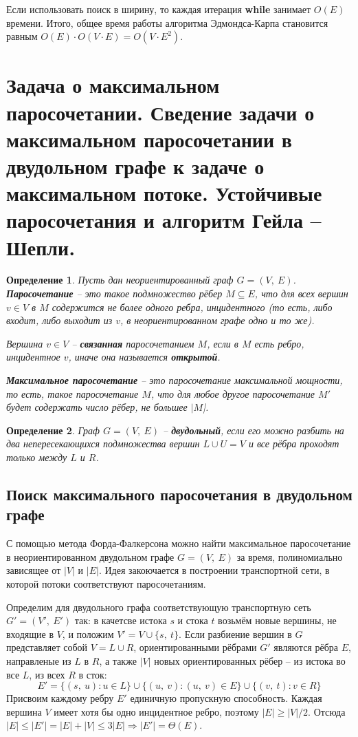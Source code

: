 \documentclass[a4paper,12pt]{article}
\newtheorem*{definition}{Определение}
\begin{document}
Если использовать поиск в ширину, то каждая итерация \textbf{while} занимает $O(E)$ времени. Итого, общее время работы алгоритма Эдмондса-Карпа становится равным $O(E) \cdot O(V \cdot E) = O(V \cdot E^2)$.
\newpage
\section{Задача о максимальном паросочетании. Сведение задачи о максимальном паросочетании в двудольном графе к задаче о максимальном потоке. Устойчивые паросочетания и алгоритм Гейла – Шепли.}

\begin{definition}
    Пусть дан неориентированный граф $G = (V,\ E)$. \textbf{Паросочетание} -- это такое подмножество рёбер $M \subseteq E$, что для всех вершин $v \in V$ в $M$ содержится не более одного ребра, инцидентного (то есть, либо входит, либо выходит из $v$, в неориентированном графе одно и то же). 
    
    Вершина $v \in V$ -- \textbf{связанная} паросочетанием $M$, если в $M$ есть ребро, инцидентное $v$, иначе она называется  \textbf{открытой}.
    
    \textbf{Максимальное паросочетание} -- это паросочетание максимальной мощности, то есть, такое паросочетание $M$, что для любое другое паросочетание $M'$ будет содержать число рёбер, не большее $|M$|.
\end{definition}

\begin{definition}
    Граф $G = (V,\ E)$ -- \textbf{двудольный}, если его можно разбить на два непересекающихся подмножества вершин $L \cup U = V$ и все рёбра проходят только между $L$ и $R$.
\end{definition}

\subsection{Поиск максимального паросочетания в двудольном графе}

С помощью метода Форда-Фалкерсона можно найти максимальное паросочетание в неориентированном двудольном графе $G = (V,\ E)$ за время, полиномиально зависящее от $|V|$ и $|E|$. Идея закоючается в построении транспортной сети, в которой потоки соответствуют паросочетаниям. 

Определим для двудольного графа соответствующую транспортную сеть $G' = (V',\ E')$ так: в качетсве истока $s$ и стока $t$ возьмём новые вершины, не входящие в  $V$, и положим $V' = V \cup \{s,\ t\}$. Если разбиение вершин в $G$ представляет собой $V = L \cup R$, ориентированными рёбрами $G'$ являются рёбра $E$, направленые из $L$ в $R$, а также $|V|$ новых ориентированных рёбер -- из истока во все $L$, из всех $R$ в сток:\[E' = \{(s,\ u) : u \in L\} \cup \{(u,\ v) : (u,\ v) \in E\} \cup \{(v,\ t) : v \in R\}\]
Присвоим каждому ребру $E'$ единичную пропускную способность. Каждая вершина $V$ имеет хотя бы одно инцидентное ребро, поэтому $|E| \geqslant |V|\slash 2$. Отсюда $|E| \leqslant |E'| = |E| + |V| \leqslant 3|E| \Rightarrow |E'| = \Theta(E)$.
\end{document}
